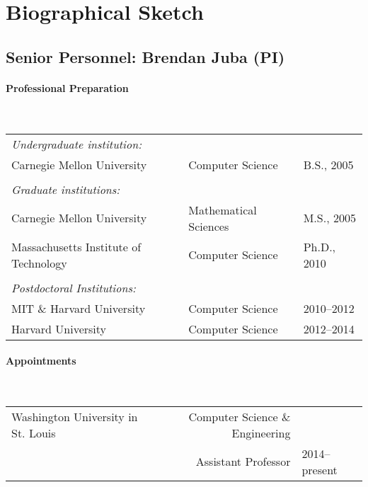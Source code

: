 \documentclass[12pt]{article}
\begin{document}
\section*{Biographical Sketch}

\subsection*{Senior Personnel: Brendan Juba (PI)}
\paragraph{Professional Preparation}
\ \\
\begin{tabular}{lll}
{\em Undergraduate institution:}& & \\
Carnegie Mellon University&Computer Science&B.S., 2005\\
 & & \\
{\em Graduate institutions:}& & \\
Carnegie Mellon University&Mathematical Sciences&M.S., 2005\\
Massachusetts Institute of Technology&Computer Science&Ph.D., 2010\\
 & & \\
{\em Postdoctoral Institutions:}& & \\
MIT \& Harvard University&Computer Science&2010--2012\\
Harvard University&Computer Science&2012--2014
\end{tabular}
\paragraph{Appointments}
\ \\
\begin{tabular}{lrl}
Washington University in St. Louis&Computer Science \& Engineering&\\
&Assistant Professor&2014--present
\end{tabular}
\end{document}
